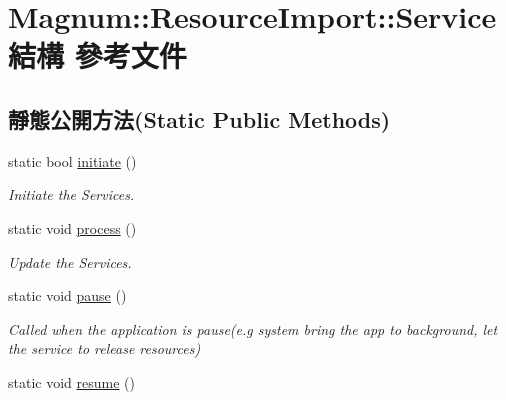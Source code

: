 \hypertarget{struct_magnum_1_1_resource_import_1_1_service}{}\section{Magnum\+:\+:Resource\+Import\+:\+:Service 結構 參考文件}
\label{struct_magnum_1_1_resource_import_1_1_service}
\subsection*{靜態公開方法(Static Public Methods)}
\begin{DoxyCompactItemize}
\item 
static bool \hyperlink{struct_magnum_1_1_resource_import_1_1_service_af5fc729240e6956dc195c3f13ba72102}{initiate} ()
\begin{DoxyCompactList}\small\item\em Initiate the Services. \end{DoxyCompactList}\item 
static void \hyperlink{struct_magnum_1_1_resource_import_1_1_service_aeff8f37e0e254a4fc0abb37e099a672f}{process} ()\hypertarget{struct_magnum_1_1_resource_import_1_1_service_aeff8f37e0e254a4fc0abb37e099a672f}{}\label{struct_magnum_1_1_resource_import_1_1_service_aeff8f37e0e254a4fc0abb37e099a672f}

\begin{DoxyCompactList}\small\item\em Update the Services. \end{DoxyCompactList}\item 
static void \hyperlink{struct_magnum_1_1_resource_import_1_1_service_a57995243c76d7d823b3dd481b1cb2da9}{pause} ()\hypertarget{struct_magnum_1_1_resource_import_1_1_service_a57995243c76d7d823b3dd481b1cb2da9}{}\label{struct_magnum_1_1_resource_import_1_1_service_a57995243c76d7d823b3dd481b1cb2da9}

\begin{DoxyCompactList}\small\item\em Called when the application is pause(e.\+g system bring the app to background, let the service to release resources) \end{DoxyCompactList}\item 
static void \hyperlink{struct_magnum_1_1_resource_import_1_1_service_aa10512ecd23771227c6bceb37d8f24d2}{resume} ()\hypertarget{struct_magnum_1_1_resource_import_1_1_service_aa10512ecd23771227c6bceb37d8f24d2}{}\label{struct_magnum_1_1_resource_import_1_1_service_aa10512ecd23771227c6bceb37d8f24d2}


\end{DoxyCompactItemize}

